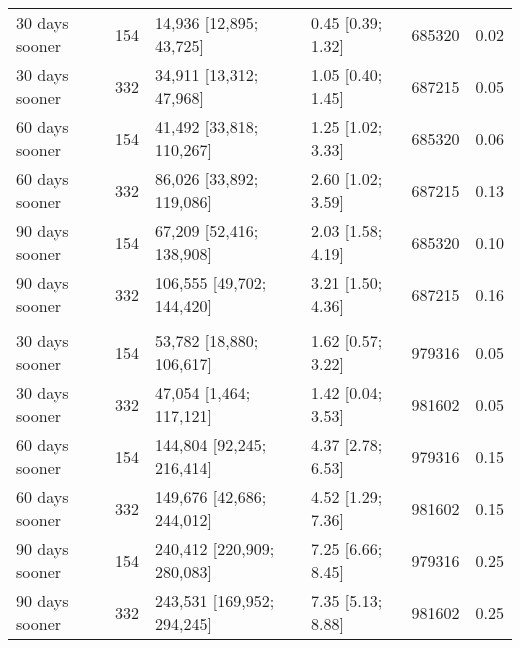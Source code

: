 \documentclass{article}
\begin{document}
\begin{table}
\begin{tabular}[t]{lrllrr}
\hspace{1em}30 days sooner & 154 & 14,936 [12,895; 43,725] & 0.45 [0.39; 1.32] & 685320 & 0.02\\
\hspace{1em}30 days sooner & 332 & 34,911 [13,312; 47,968] & 1.05 [0.40; 1.45] & 687215 & 0.05\\
\hspace{1em}60 days sooner & 154 & 41,492 [33,818; 110,267] & 1.25 [1.02; 3.33] & 685320 & 0.06\\
\hspace{1em}60 days sooner & 332 & 86,026 [33,892; 119,086] & 2.60 [1.02; 3.59] & 687215 & 0.13\\
\hspace{1em}90 days sooner & 154 & 67,209 [52,416; 138,908] & 2.03 [1.58; 4.19] & 685320 & 0.10\\
\hspace{1em}90 days sooner & 332 & 106,555 [49,702; 144,420] & 3.21 [1.50; 4.36] & 687215 & 0.16\\
\addlinespace[0.3em]
\multicolumn{6}{l}{\textbf{US to Jan 2022}}\\
\hspace{1em}30 days sooner & 154 & 53,782 [18,880; 106,617] & 1.62 [0.57; 3.22] & 979316 & 0.05\\
\hspace{1em}30 days sooner & 332 & 47,054 [1,464; 117,121] & 1.42 [0.04; 3.53] & 981602 & 0.05\\
\hspace{1em}60 days sooner & 154 & 144,804 [92,245; 216,414] & 4.37 [2.78; 6.53] & 979316 & 0.15\\
\hspace{1em}60 days sooner & 332 & 149,676 [42,686; 244,012] & 4.52 [1.29; 7.36] & 981602 & 0.15\\
\hspace{1em}90 days sooner & 154 & 240,412 [220,909; 280,083] & 7.25 [6.66; 8.45] & 979316 & 0.25\\
\hspace{1em}90 days sooner & 332 & 243,531 [169,952; 294,245] & 7.35 [5.13; 8.88] & 981602 & 0.25\\
\bottomrule
\end{tabular}
\end{table}
\end{document}
